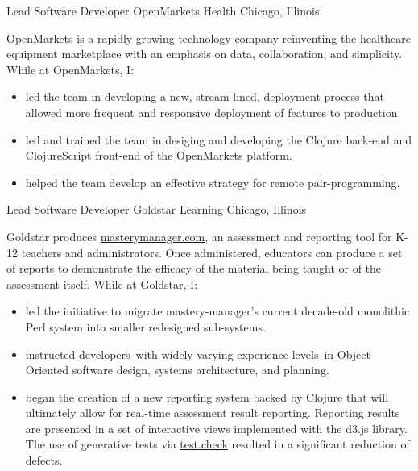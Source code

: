 \documentclass[11pt,letterpaper]{moderncv}
\begin{document}
 {Lead Software Developer}
  {OpenMarkets Health} {Chicago, Illinois} {} { %
  OpenMarkets is a rapidly growing technology company reinventing the
  healthcare equipment marketplace with an emphasis on data, collaboration,
  and simplicity.  While at OpenMarkets, I:
  \begin{itemize}
  \item led the team in developing a new, stream-lined, deployment process
    that allowed more frequent and responsive deployment of features to
    production.
  \item led and trained the team in desiging and developing the Clojure
    back-end and ClojureScript front-end of the OpenMarkets platform.
  \item helped the team develop an effective strategy for remote
    pair-programming.
  \end{itemize}
}

 {Lead Software Developer} {Goldstar
  Learning} {Chicago, Illinois} {} { %
  Goldstar produces \href{https://www.masterymanager.com}{masterymanager.com},
  an assessment and reporting tool for K-12 teachers and administrators.  Once
  administered, educators can produce a set of reports to demonstrate the
  efficacy of the material being taught or of the assessment itself.  While at
  Goldstar, I:
  \begin{itemize}
  \item led the initiative to migrate mastery-manager's current decade-old
    monolithic Perl system into smaller redesigned sub-systems.
  \item instructed developers--with widely varying experience
    levels--in Object-Oriented software design, systems architecture,
    and planning.
  \item began the creation of a new reporting system backed by
    Clojure that will ultimately allow for real-time assessment
    result reporting.  Reporting results are presented in a set of
    interactive views implemented with the d3.js library.  The use of
    generative tests via
    \href{https://github.com/clojure/test.check}{test.check} resulted
    in a significant reduction of defects.
  \end{itemize}
}
\end{document}
